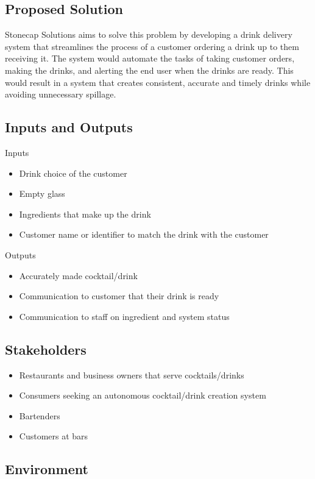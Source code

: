 \documentclass{article}
\begin{document}
\subsection{Proposed Solution}
Stonecap Solutions aims to solve this problem by developing a drink delivery system that streamlines the process of a customer ordering a drink up to them receiving it. The system would automate the tasks of taking customer orders, making the drinks, and alerting the end user when the drinks are ready. This would result in a system that creates consistent, accurate and timely drinks while avoiding unnecessary spillage.

\subsection{Inputs and Outputs}
Inputs
\begin{itemize}
\item Drink choice of the customer
\item Empty glass
\item Ingredients that make up the drink
\item Customer name or identifier to match the drink with the customer
\end{itemize}
Outputs
\begin{itemize}
    \item Accurately made cocktail/drink
    \item Communication to customer that their drink is ready 
    \item Communication to staff on ingredient and system status
\end{itemize}
\subsection{Stakeholders}
\begin{itemize}
    \item Restaurants and business owners that serve cocktails/drinks
    \item Consumers seeking an autonomous cocktail/drink creation system
    \item Bartenders
    \item Customers at bars
\end{itemize}

\subsection{Environment}
\end{document}
